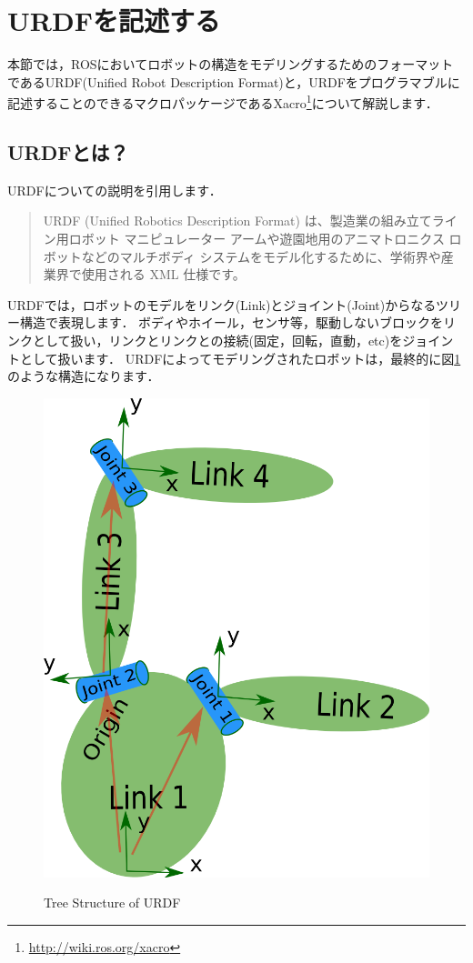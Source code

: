 \documentclass[{../../master}]{subfiles}
\begin{document}
\section{URDFを記述する}

本節では，ROSにおいてロボットの構造をモデリングするためのフォーマットであるURDF(Unified Robot Description Format)と，URDFをプログラマブルに記述することのできるマクロパッケージであるXacro\footnote{\url{http://wiki.ros.org/xacro}}について解説します．

\subsection{URDFとは？}

URDFについての説明を引用します．\cite{what_is_urdf}

\begin{quote}
  URDF (Unified Robotics Description Format) は、製造業の組み立てライン用ロボット マニピュレーター アームや遊園地用のアニマトロニクス ロボットなどのマルチボディ システムをモデル化するために、学術界や産業界で使用される XML 仕様です。
\end{quote}

URDFでは，ロボットのモデルをリンク(Link)とジョイント(Joint)からなるツリー構造で表現します．
ボディやホイール，センサ等，駆動しないブロックをリンクとして扱い，リンクとリンクとの接続(固定，回転，直動，etc)をジョイントとして扱います．
URDFによってモデリングされたロボットは，最終的に図\ref{fig:urdf_tree}のような構造になります．

\begin{figure}[ht]
  \centering
  \includegraphics[width=70truemm, clip]{images/urdf_tree.png}
  \label{fig:urdf_tree}
  \caption{Tree Structure of URDF}
\end{figure}
\end{document}
